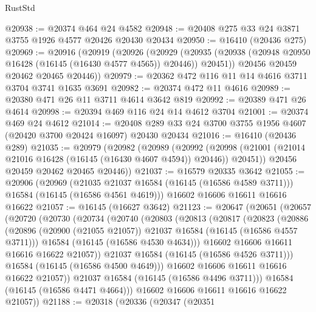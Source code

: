 \begin{lexlean}{RustStd}
\begin{coremodule}
@20938 := @20374 @464 @24 @4582
@20948 := @20408 @275 @33 @24 @3871 @3755 @1926 @4577 @20426 @20430 @20434
@20950 := @16410 (@20436 @275)
@20969 := @20916
    (@20919
      (@20926
        (@20929
          (@20935 (@20938 (@20948 @20950 @16428 (@16145 (@16430 @4577 @4565)) @20446)) @20451))
        @20456
        @20459
        @20462
        @20465
        @20446))
@20979 := @20362 @472 @116 @11 @14 @4616 @3711 @3704 @3741 @1635 @3691
@20982 := @20374 @472 @11 @4616
@20989 := @20380 @471 @26 @11 @3711 @4614 @3642 @819
@20992 := @20389 @471 @26 @4614
@20998 := @20394 @469 @116 @24 @14 @4612 @3704
@21001 := @20374 @469 @24 @4612
@21014 := @20408 @289 @33 @24 @3700 @3755 @1956 @4607 (@20420 @3700 @20424 @16097) @20430 @20434
@21016 := @16410 (@20436 @289)
@21035 := @20979
    (@20982
      (@20989
        (@20992
          (@20998 (@21001 (@21014 @21016 @16428 (@16145 (@16430 @4607 @4594)) @20446)) @20451))
        @20456
        @20459
        @20462
        @20465
        @20446))
@21037 := @16579 @20335 @3642
@21055 := @20906
    (@20969
      (@21035 @21037 @16584 (@16145 (@16586 @4589 @3711)))
      @16584
      (@16145 (@16586 @4561 @4619)))
    @16602
    @16606
    @16611
    @16616
    @16622
@21057 := @16145 (@16627 @3642)
@21123 := @20647
    (@20651
      (@20657
        (@20720
          (@20730
            (@20734
              (@20740
                (@20803
                  (@20813
                    (@20817
                      (@20823
                        (@20886
                          (@20896
                            (@20900 (@21055 @21057))
                            @21037
                            @16584
                            (@16145 (@16586 @4557 @3711)))
                          @16584
                          (@16145 (@16586 @4530 @4634)))
                        @16602
                        @16606
                        @16611
                        @16616
                        @16622
                        @21057))
                    @21037
                    @16584
                    (@16145 (@16586 @4526 @3711)))
                  @16584
                  (@16145 (@16586 @4500 @4649)))
                @16602
                @16606
                @16611
                @16616
                @16622
                @21057))
            @21037
            @16584
            (@16145 (@16586 @4496 @3711)))
          @16584
          (@16145 (@16586 @4471 @4664)))
        @16602
        @16606
        @16611
        @16616
        @16622
        @21057))
@21188 := @20318
    (@20336
      (@20347
        (@20351

\end{coremodule}
\end{lexlean}
